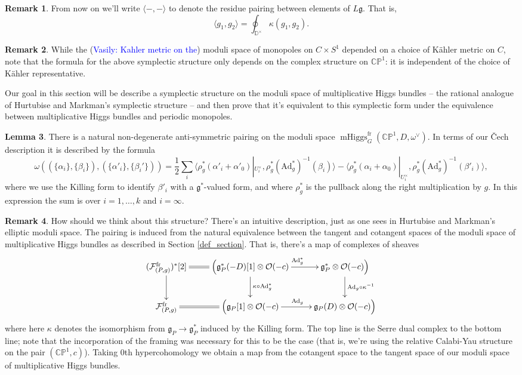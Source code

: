 \documentclass[11pt, oneside, reqno]{amsart}
\theoremstyle{definition} \newtheorem{definition}{Definition}[section]
\newtheorem{lemma}[definition]{Lemma}
\theoremstyle{definition} \newtheorem{remark}[definition]{Remark}
\theoremstyle{definition} \newtheorem{remarks}[definition]{Remarks}
\theoremstyle{definition} \newtheorem{question}[definition]{Question}
\theoremstyle{definition} \newtheorem*{note}{Note}
\theoremstyle{definition} \newtheorem{example}[definition]{Example}
\theoremstyle{definition} \newtheorem{examples}[definition]{Examples}
\renewcommand{\gg}{\mathfrak{g}}
\newcommand{\bb}[1]{\mathbb{#1}}
\newcommand{\mr}[1]{\mathrm{#1}}
\newcommand{\mc}[1]{\mathcal{#1}}
\newcommand{\OO}{\mathcal{O}}
\DeclareMathOperator{\mhiggs}{mHiggs}
\newcommand{\fr}{\mathrm{fr}}
\newcommand{\Ad}{\mr{Ad}}
\newcommand{\vasily}[1]{(\textcolor{blue}{Vasily: #1})}
\begin{document}
\begin{remark}
From now on we'll write $\langle - , - \rangle$ to denote the residue pairing between elements of $L\gg$.  That is, 
\[\langle g_1, g_2 \rangle = \oint_{\bb D^\times} \kappa(g_1, g_2).\]
\end{remark}

\begin{remark}
While the \vasily{Kahler metric on the} moduli space of monopoles on $C \times S^1$ depended on a choice of K\"ahler metric on $C$, note that the formula for the above symplectic structure only depends on the complex structure on $\bb{CP}^1$: it is independent of the choice of K\"ahler representative.
\end{remark}

Our goal in this section will be describe a symplectic structure on the moduli space of multiplicative Higgs bundles -- the rational analogue of Hurtubise and Markman's symplectic structure -- and then prove that it's equivalent to this symplectic form under the equivalence between multiplicative Higgs bundles and periodic monopoles.

\begin{lemma} \label{sym_nondegeneracy_lemma}
There is a natural non-degenerate anti-symmetric pairing on the moduli space $\mhiggs_G^{\fr}(\bb{CP}^1,D,\omega^\vee)$.  In terms of our \v Cech description it is described by the formula 
\[\omega((\{\alpha_i\}, \{\beta_i\}), (\{\alpha'_i\},\{\beta_i'\})) = \frac 12 \sum_i \langle \rho_g^*(\alpha'_i + \alpha'_0)|_{U^\times_i}, \rho_g^*(\Ad_g^*)^{-1}(\beta_i) \rangle - \langle \rho_g^*(\alpha_i + \alpha_0)|_{U^\times_i}, \rho_g^*(\Ad_g^*)^{-1}(\beta'_i) \rangle,\]
where we use the Killing form to identify $\beta'_i$ with a $\gg^*$-valued form, and where $\rho_g^*$ is the pullback along the right multiplication by $g$.  In this expression the sum is over $i=1,\ldots,k$ and $i=\infty$.
\end{lemma}

\begin{remark}
How should we think about this structure?  There's an intuitive description, just as one sees in Hurtubise and Markman's elliptic moduli space.  The pairing is induced from the natural equivalence between the tangent and cotangent spaces of the moduli space of multiplicative Higgs bundles as described in Section \ref{def_section}.  That is, there's a map of complexes of sheaves
\[\xymatrix{
(\mc F^\fr_{(P,g)})^*[2] \ar@{=}[r] \ar[d] &\Big(\gg^*_P(-D)[1] \otimes \OO(-c) \ar[d]^{\kappa \circ \Ad_g^*} \ar[r]^{\Ad_g^*} &\gg^*_P \otimes \OO(-c)\Big)\ar[d]^{\Ad_g \circ \kappa^{-1}} \\
\mc F^\fr_{(P,g)} \ar@{=}[r] &\Big(\gg_P[1] \otimes \OO(-c) \ar[r]^{\Ad_g} &\gg_P(D) \otimes \OO(-c)\Big)
}\]
where here $\kappa$ denotes the isomorphism from $\gg_P \to \gg^*_P$ induced by the Killing form.  The top line is the Serre dual complex to the bottom line; note that the incorporation of the framing was necessary for this to be the case (that is, we're using the relative Calabi-Yau structure on the pair $(\bb{CP}^1, c)$).  Taking 0th hypercohomology we obtain a map from the cotangent space to the tangent space of our moduli space of multiplicative Higgs bundles.
\end{remark}
\end{document}
